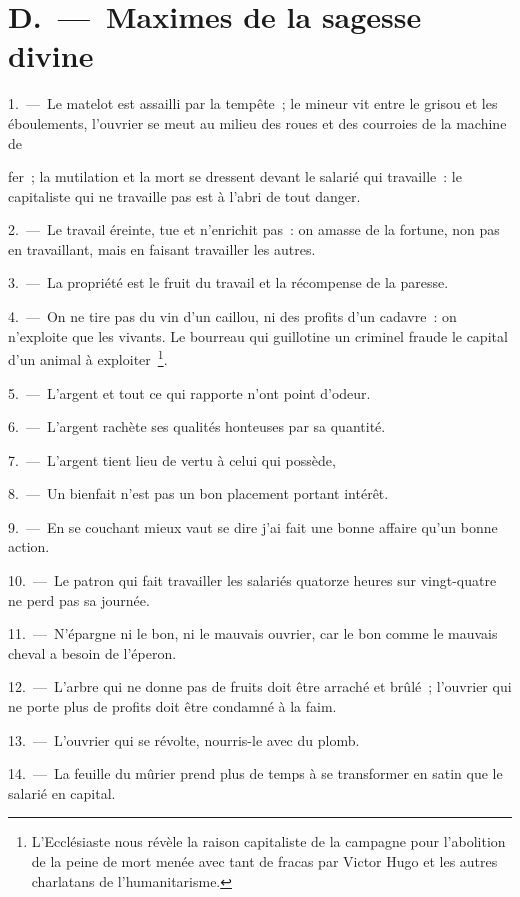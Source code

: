 \documentclass[french,twoside]{book} %
\begin{document}
\section[{D. — Maximes de la sagesse divine}]{D. — Maximes de la sagesse divine}
1. — Le matelot est assailli par la tempête ; le mineur vit entre le grisou et les éboulements, l’ouvrier se meut au milieu des roues et des courroies de la machine de\par
fer ; la mutilation et la mort se dressent devant le salarié qui travaille : le capitaliste qui ne travaille pas est à l’abri de tout danger.\par
2. — Le travail éreinte, tue et n’enrichit pas : on amasse de la fortune, non pas en travaillant, mais en faisant travailler les autres.\par
3. — La propriété est le fruit du travail et la récompense de la paresse.\par
4. — On ne tire pas du vin d’un caillou, ni des profits d’un cadavre : on n’exploite que les vivants. Le bourreau qui guillotine un criminel fraude le capital d’un animal à exploiter \footnote{L'Ecclésiaste nous révèle la raison capitaliste de la campagne pour l’abolition de la peine de mort menée avec tant de fracas par Victor Hugo et les autres charlatans de l’humanitarisme.}.\par
5. — L'argent et tout ce qui rapporte n’ont point d’odeur.\par
6. — L'argent rachète ses qualités honteuses par sa quantité.\par
7. — L'argent tient lieu de vertu à celui qui possède,\par
8. — Un bienfait n’est pas un bon placement portant intérêt.\par
9. — En se couchant mieux vaut se dire j’ai fait une bonne affaire qu’un bonne action.\par
10. — Le patron qui fait travailler les salariés quatorze heures sur vingt-quatre ne perd pas sa journée.\par
11. — N'épargne ni le bon, ni le mauvais ouvrier, car le bon comme le mauvais cheval a besoin de l’éperon.\par
12. — L'arbre qui ne donne pas de fruits doit être arraché et brûlé ; l’ouvrier qui ne porte plus de profits doit être condamné à la faim.\par
13. — L'ouvrier qui se révolte, nourris-le avec du plomb.\par
14. — La feuille du mûrier prend plus de temps à se transformer en satin que le salarié en capital.\par
\end{document}
